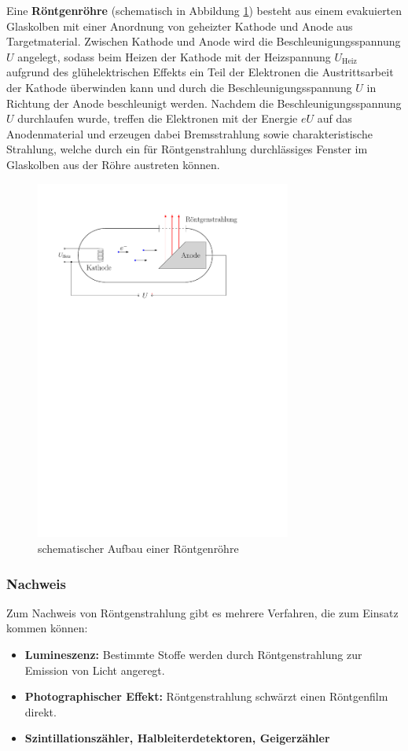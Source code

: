 \documentclass[11pt, a4paper]{article}
\numberwithin{equation}{section}
\begin{document}
Eine \textbf{Röntgenröhre} (schematisch in Abbildung \ref{fig:roehre}) besteht aus einem evakuierten Glaskolben mit einer Anordnung von geheizter Kathode und Anode aus Targetmaterial.
Zwischen Kathode und Anode wird die Beschleunigungsspannung $U$ angelegt, sodass beim Heizen der Kathode mit der Heizspannung $U_\mathrm{Heiz}$ aufgrund des glühelektrischen Effekts ein Teil der Elektronen die Austrittsarbeit der Kathode überwinden kann und durch die Beschleunigungsspannung $U$ in Richtung der Anode beschleunigt werden.
Nachdem die Beschleunigungsspannung $U$ durchlaufen wurde, treffen die Elektronen mit der Energie $e U$ auf das Anodenmaterial und erzeugen dabei Bremsstrahlung sowie charakteristische Strahlung, welche durch ein für Röntgenstrahlung durchlässiges Fenster im Glaskolben aus der Röhre austreten können.
\begin{figure}[ht]
	\centering
	\includegraphics[width=0.75\textwidth]{./figures/roentgenroehre.pdf}
	\caption{schematischer Aufbau einer Röntgenröhre}
	\label{fig:roehre}
\end{figure}


\subsubsection{Nachweis}
Zum Nachweis von Röntgenstrahlung gibt es mehrere Verfahren, die zum Einsatz kommen können:
\begin{itemize}
	\item \textbf{Lumineszenz:} Bestimmte Stoffe werden durch Röntgenstrahlung zur Emission von Licht angeregt.
	
	\item \textbf{Photographischer Effekt:} Röntgenstrahlung schwärzt einen Röntgenfilm direkt.
	
	\item \textbf{Szintillationszähler, Halbleiterdetektoren, Geigerzähler}
\end{itemize}
\end{document}
